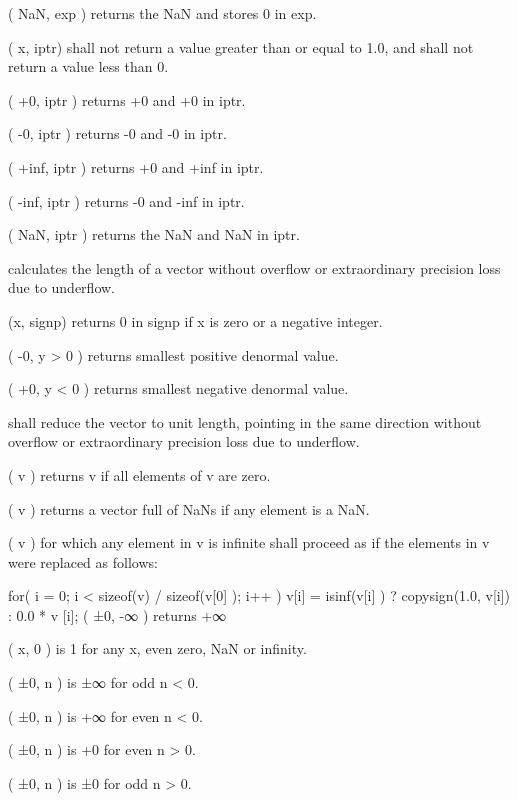  ( NaN, exp ) returns the NaN and stores 0 in exp.\par
\blank
{} ( x, iptr) shall not return a value greater than or equal to 1.0,
and shall not return a value less than 0.\par
\blank
{} ( +0, iptr ) returns +0 and +0 in iptr.\par
{} ( -0, iptr ) returns -0 and -0 in iptr.\par
{} ( +inf, iptr ) returns +0 and +inf in iptr.\par
{} ( -inf, iptr ) returns -0 and -inf in iptr.\par
{} ( NaN, iptr ) returns the NaN and NaN in iptr.\par
\blank
{} calculates the length of a vector without overflow or extraordinary precision loss
due to underflow.\par
\blank
{} (x, signp) returns 0 in signp if x is zero or a negative integer.\par
\blank
{} ( -0, y > 0 ) returns smallest positive denormal value.\par
{} ( +0, y < 0 ) returns smallest negative denormal value.\par
\blank
{} shall reduce the vector to unit length, pointing in the same direction without
overflow or extraordinary precision loss due to underflow.\par
{} ( v ) returns v if all elements of v are zero.\par
{} ( v ) returns a vector full of NaNs if any element is a NaN.\par
{} ( v ) for which any element in v is infinite shall proceed as if the elements in v
were replaced as follows:\par
\startclc
for( i = 0; i < sizeof(v) / sizeof(v[0] ); i++ )
	v[i] = isinf(v[i] ) ? copysign(1.0, v[i]) : 0.0 * v [i];
\stopclc
\blank
{} ( ±0, -∞ ) returns +∞\par
\blank
{} ( x, 0 ) is 1 for any x, even zero, NaN or infinity.\par
{} ( ±0, n ) is ±∞ for odd n < 0.\par
{} ( ±0, n ) is +∞ for even n < 0.\par
{} ( ±0, n ) is +0 for even n > 0.\par
{} ( ±0, n ) is ±0 for odd n > 0.\par
